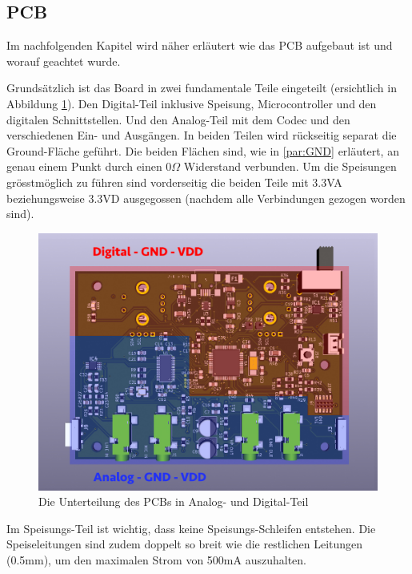 \subsection{PCB}
\label{sec:PCB}

Im nachfolgenden Kapitel wird näher erläutert wie das PCB aufgebaut ist und worauf geachtet wurde.

Grundsätzlich ist das Board in zwei fundamentale Teile eingeteilt (ersichtlich in Abbildung \ref{fig:PCB_GNDVDD}).  Den Digital-Teil inklusive Speisung, Microcontroller und den digitalen Schnittstellen. Und den Analog-Teil mit dem Codec und den verschiedenen Ein- und Ausgängen. In beiden Teilen wird rückseitig separat die Ground-Fläche geführt. Die beiden Flächen sind, wie in \ref{par:GND} erläutert, an genau einem Punkt durch einen $0\Omega$ Widerstand verbunden. Um die Speisungen grösstmöglich zu führen sind vorderseitig die beiden Teile mit 3.3VA beziehungsweise 3.3VD ausgegossen (nachdem alle Verbindungen gezogen worden sind).

\begin{figure} [H]
\begin{center}
 \includegraphics[scale=0.37]{../graphics/PCB-Layout_GNDVDD.jpg}
 \caption{Die Unterteilung des PCBs in Analog- und Digital-Teil}
\label{fig:PCB_GNDVDD}
\end{center}
\end{figure}

Im Speisungs-Teil ist wichtig, dass keine Speisungs-Schleifen entstehen. Die  Speiseleitungen sind zudem doppelt so breit wie die restlichen Leitungen (0.5mm), um den maximalen Strom von 500mA auszuhalten.

